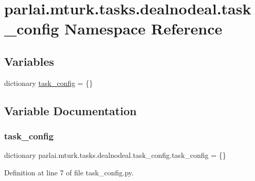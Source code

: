 \hypertarget{namespaceparlai_1_1mturk_1_1tasks_1_1dealnodeal_1_1task__config}{}\section{parlai.\+mturk.\+tasks.\+dealnodeal.\+task\+\_\+config Namespace Reference}
\label{namespaceparlai_1_1mturk_1_1tasks_1_1dealnodeal_1_1task__config}
\subsection*{Variables}
\begin{DoxyCompactItemize}
\item 
dictionary \hyperlink{namespaceparlai_1_1mturk_1_1tasks_1_1dealnodeal_1_1task__config_a1691705e132966d176cd01b6e3dc1b1a}{task\+\_\+config} = \{\}
\end{DoxyCompactItemize}


\subsection{Variable Documentation}
\mbox{\label{namespaceparlai_1_1mturk_1_1tasks_1_1dealnodeal_1_1task__config_a1691705e132966d176cd01b6e3dc1b1a}} 
\subsubsection{\texorpdfstring{task\+\_\+config}{task\_config}}
{\footnotesize\ttfamily dictionary parlai.\+mturk.\+tasks.\+dealnodeal.\+task\+\_\+config.\+task\+\_\+config = \{\}}



Definition at line 7 of file task\+\_\+config.\+py.

